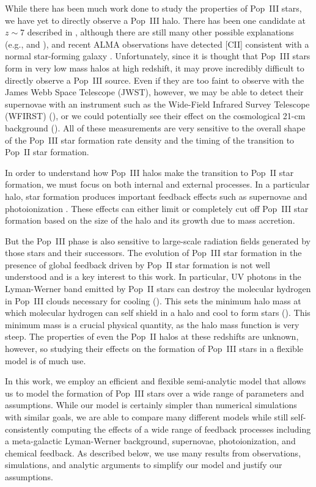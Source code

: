 \documentclass[a4paper,fleqn,usenatbib]{mnras}
\begin{document}
While there has been much work done to study the properties of Pop~III stars, we have yet to directly observe a Pop~III halo. 
There has been one candidate at $z \sim 7$ described in \citet{sobral_2015}, although there are still many other possible explanations (e.g., \citealt{bowler_2017} and \citealt{agarwal_2016}), and recent ALMA observations have detected [CII] consistent with a normal star-forming galaxy \citep[][]{matthee_2017}. Unfortunately, since it is thought that Pop~III stars form in very low mass halos at high redshift, it may prove incredibly difficult to directly observe a Pop~III source. Even if they are too faint to observe with the James Webb Space Telescope (JWST), however, we may be able to detect their supernovae with an instrument such as the Wide-Field Infrared Survey Telescope (WFIRST) (\citealt{whalen_2013}), or we could potentially see their effect on the cosmological 21-cm background (\citealt{mirocha_2017}). All of these measurements
are very sensitive to the overall shape of the Pop~III star formation rate density and the timing of the transition to Pop~II star formation.

In order to understand how Pop~III halos make the transition to Pop~II star formation, we must focus on both internal and external processes. In a particular halo, star formation produces important feedback effects such as supernovae and photoionization \citep[see][]{bromm_2003, whalen_2008, whalen_2008b}. These effects can either limit or completely cut 
off Pop~III star formation based on the size of the halo and its growth due to mass accretion.

But the Pop~III phase is also sensitive to large-scale radiation fields generated by those stars and their successors. 
The evolution of Pop~III star formation in the presence of global feedback driven by Pop~II star formation is not well understood and is a key interest to this work. In particular, UV photons in the Lyman-Werner band emitted by Pop~II stars can destroy the molecular hydrogen in Pop~III clouds necessary for cooling (\citealt{haiman_1997}). 
This sets the minimum halo mass at which molecular hydrogen can self shield in a halo and cool to form stars (\citealt{visbal_2014}). This minimum mass is a crucial 
physical quantity, as the halo mass function is very steep. The properties of even the Pop~II halos at these redshifts are unknown, however, so studying their effects on the formation of Pop~III stars in a flexible model is of much use.

In this work, we employ 
an efficient and flexible semi-analytic model that allows us to model the formation of Pop~III stars over a wide range of parameters and assumptions. While our model is certainly simpler than numerical simulations with similar goals, we are able to compare many different models while still self-consistently computing the effects of a wide range of feedback processes including a meta-galactic Lyman-Werner background, supernovae, photoionization, and chemical feedback. As described below, we use many results from observations, simulations, and analytic arguments to simplify our model and justify our assumptions. 
\end{document}
